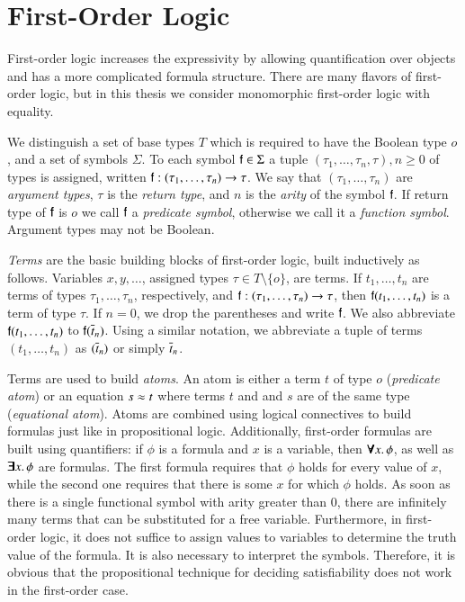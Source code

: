 \section{First-Order Logic}
\label{sec:pre:fol}

First-order logic increases the expressivity by allowing quantification over
objects and has a more complicated formula structure. There are many flavors of
first-order logic, but in this thesis we consider monomorphic first-order logic
with equality.

We distinguish a set of base types $T$ which is required to have the Boolean
type $o$, and a set of symbols $\Sigma$. To each symbol $\mathsf{f} \in \Sigma$ a
tuple $(\tau_1, \ldots, \tau_{n}, \tau), n \geq 0$ of types is assigned, written
$\mathsf{f} : (\tau_1, \ldots, \tau_{n}) \rightarrow \tau$. We say that $(\tau_1,
\ldots, \tau_{n})$ are \emph{argument types}, $\tau$ is the \emph{return type}, and $n$
is the \emph{arity} of the symbol $\mathsf{f}$. If return type of $\mathsf{f}$ is $o$ we call
$\mathsf{f}$ a \emph{predicate symbol}, otherwise we call it a \emph{function symbol}. Argument types may not be Boolean.

\emph{Terms} are the basic building blocks of first-order logic, built inductively as follows. Variables
$x,y,\ldots$, assigned types $\tau \in T\setminus \{ o \}$, are terms. If $t_1,\ldots,t_n$ are
terms of types $\tau_1, \ldots, \tau_n$, respectively, and $\mathsf{f} : (\tau_1,
\ldots, \tau_{n}) \rightarrow \tau$, then $\mathsf{f}(t_1, \ldots, t_n)$ is a term
of type $\tau$. If $n=0$, we drop the parentheses and write $\mathsf{f}$. We also
abbreviate $\mathsf{f}(t_1, \ldots, t_n)$ to $\mathsf{f}(\overline{t}_{n})$. Using a similar
notation, we abbreviate a tuple of terms $(t_1, \ldots, t_n)$ as $(\overline{t}_{n})$
or simply $\overline{t}_{n}$.

Terms are used to build \emph{atoms}. An atom is either a term $t$ of type $o$ (\emph{predicate atom}) or an
equation $s \approx t$ where terms $t$ and and $s$ are of the same type (\emph{equational atom}). Atoms are
combined using logical connectives to build formulas just like in propositional
logic. Additionally, first-order formulas are built using quantifiers: if $\phi$
is a formula and $x$ is a variable, then $\pmb{\forall} x.\, \phi$, as well as
$\pmb{\exists} x.\, \phi$ are formulas. The first formula requires that $\phi$ holds
for every value of $x$, while the second one requires that there is some $x$ for
which $\phi$ holds. As soon as there is a single functional symbol with arity
greater than 0, there are infinitely many terms that can be substituted for a
free variable. Furthermore, in first-order logic, it does not suffice to assign
values to variables to determine the truth value of the formula. It is also
necessary to interpret the symbols. Therefore, it is obvious that the propositional
technique for deciding satisfiability does not work in the first-order case.

